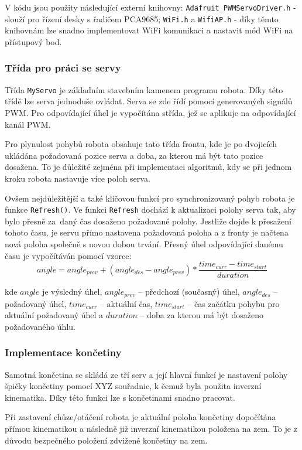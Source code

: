 V kódu jsou použity následující externí knihovny: \texttt{Adafruit\_PWMServoDriver.h} - slouží pro řízení desky s řadičem PCA9685; \texttt{WiFi.h} a \texttt{WifiAP.h} - díky těmto knihovnám lze snadno implementovat WiFi komunikaci a nastavit mód WiFi na přístupový bod.

\subsubsection*{Třída pro práci se servy}
Třída \texttt{MyServo} je základním stavebním kamenem programu robota. Díky této třídě lze serva jednoduše ovládat. Serva se zde řídí pomocí generovaných signálů PWM. Pro odpovídající úhel je vypočítána střída, jež se aplikuje na odpovídající kanál PWM.

Pro plynulost pohybů robota obsahuje tato třída frontu, kde je po dvojicích ukládána požadovaná pozice serva a doba, za kterou má být tato pozice dosažena. To je důležité zejména při implementaci algoritmů, kdy se při jednom kroku robota nastavuje více poloh serva. 

Ovšem nejdůležitější a také klíčovou funkcí pro synchronizovaný pohyb robota je funkce \texttt{Refresh()}. Ve funkci \texttt{Refresh} dochází k aktualizaci polohy serva tak, aby bylo přesně za~daný čas dosaženo požadované polohy. Jestliže dojde k přesažení tohoto času, je servu přímo nastavena požadovaná poloha a z fronty je načtena nová poloha společně s novou dobou trvání. Přesný úhel odpovídající danému času je vypočítáván pomocí vzorce:
$$angle = angle_{prev} + (angle_{des} - angle_{prev}) * \frac{time_{curr} - time_{start}}{duration}$$

\noindent kde $angle$ je výsledný úhel, $angle_{prev}$ -- předchozí (současný) úhel, $angle_{des}$ -- požadovaný úhel, $time_{curr}$ -- aktuální čas, $time_{start}$ -- čas začátku pohybu pro aktuální požadovaný úhel a $duration$ -- doba za kterou má být dosaženo požadovaného úhlu.


\subsubsection*{Implementace končetiny}
Samotná končetina se skládá ze tří serv a její hlavní funkcí je nastavení polohy špičky končetiny pomocí XYZ souřadnic, k čemuž byla použita inverzní kinematika. Díky této funkci lze s končetinami snadno pracovat.

Při zastavení chůze/otáčení robota je aktuální poloha končetiny dopočítána přímou kinematikou a následně již inverzní kinematikou položena na zem. To je z důvodu bezpečného položení zdvižené končetiny na zem.


